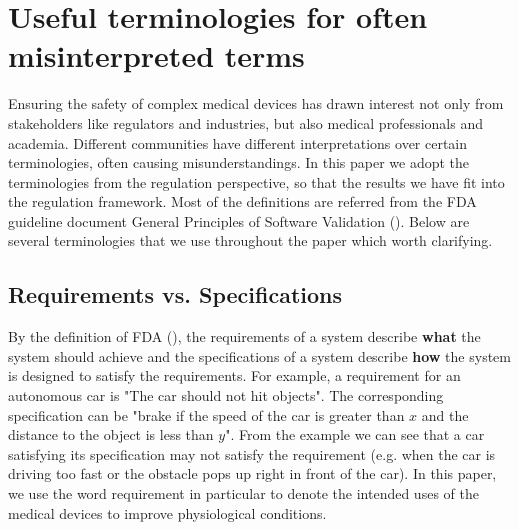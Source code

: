 \vspace{-10pt}
\section{Useful terminologies for often misinterpreted terms}
Ensuring the safety of complex medical devices has drawn interest not only from stakeholders like regulators and industries, but also medical professionals and academia. Different communities have different interpretations over certain terminologies, often causing misunderstandings. In this paper we adopt the terminologies from the regulation perspective, so that the results we have fit into the regulation framework. Most of the definitions are referred from the FDA guideline document General Principles of Software Validation (\cite{fda2}). Below are several terminologies that we use throughout the paper which worth clarifying.
\vspace{-5pt}
\subsection{Requirements vs. Specifications}
By the definition of FDA (\cite{fda3}), the requirements of a system describe \textbf{what} the system should achieve and the specifications of a system describe \textbf{how} the system is designed to satisfy the requirements. For example, a requirement for an autonomous car is "The car should not hit objects". The corresponding specification can be "brake if the speed of the car is greater than $x$ and the distance to the object is less than $y$". From the example we can see that a car satisfying its specification may not satisfy the requirement (e.g. when the car is driving too fast or the obstacle pops up right in front of the car). In this paper, we use the word requirement in particular to denote the intended uses of the medical devices to improve physiological conditions.

